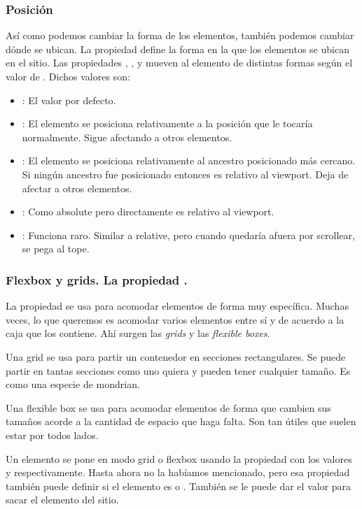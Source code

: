 \begin{frame}
\frametitle{Posición}

    Así como podemos cambiar la forma de los elementos, también podemos cambiar 
    dónde se ubican. La propiedad  define la forma en la 
    que los elementos se ubican en el sitio. Las propiedades , 
    ,  y  mueven al elemento 
    de distintas formas según el valor de . Dichos valores son: 

    \begin{itemize}
        \item {}: El valor por defecto.
        \item {}: El elemento se posiciona relativamente a la 
              posición que le tocaría normalmente. Sigue afectando a otros elementos.
        \item {}: El elemento se posiciona relativamente al ancestro 
              posicionado más cercano. Si ningún ancestro fue posicionado entonces es 
              relativo al viewport. Deja de afectar a otros elementos.
        \item {}: Como absolute pero directamente es relativo al viewport.
        \item {}: Funciona raro. Similar a relative, pero cuando quedaría 
              afuera por scrollear, se pega al tope.
    \end{itemize}

\end{frame}

\begin{frame}
\frametitle{Flexbox y grids. La propiedad .}

    La propiedad  se usa para acomodar elementos de forma 
    muy específica. Muchas veces, lo que queremos es acomodar varios elementos 
    entre sí y de acuerdo a la caja que los contiene. Ahí surgen las \emph{grids} y 
    las \emph{flexible boxes}.

    Una grid se usa para partir un contenedor en secciones rectangulares. Se puede 
    partir en tantas secciones como uno quiera y pueden tener cualquier tamaño. Es 
    como una especie de mondrian.

    Una flexible box se usa para acomodar elementos de forma que cambien sus tamaños 
    acorde a la cantidad de espacio que haga falta. Son tan útiles que suelen estar 
    por todos lados.

    Un elemento se pone en modo grid o flexbox usando la propiedad  
    con los valores  y  respectivamente. Hasta ahora 
    no la habíamos mencionado, pero esa propiedad también puede definir si el elemento 
    es  o . También se le puede dar el valor 
     para sacar el elemento del sitio.

\end{frame}

